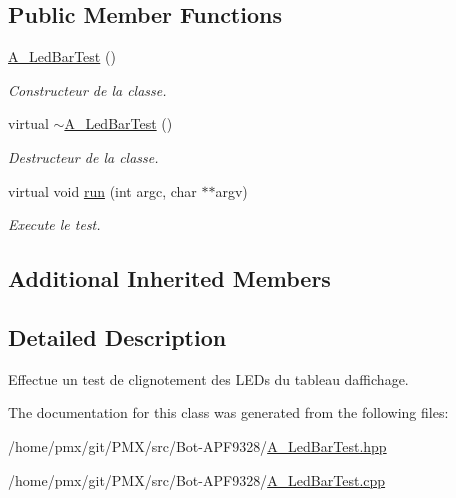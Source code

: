 \subsection*{Public Member Functions}
\begin{DoxyCompactItemize}
\item 
\mbox{\label{classA__LedBarTest_ab3cc5ded06f6910e1cca9cd7a744f1f0}} 
\hyperlink{classA__LedBarTest_ab3cc5ded06f6910e1cca9cd7a744f1f0}{A\+\_\+\+Led\+Bar\+Test} ()
\begin{DoxyCompactList}\small\item\em Constructeur de la classe. \end{DoxyCompactList}\item 
\mbox{\label{classA__LedBarTest_a31f48a88b348e476c7633ebf8ada64f0}} 
virtual \hyperlink{classA__LedBarTest_a31f48a88b348e476c7633ebf8ada64f0}{$\sim$\+A\+\_\+\+Led\+Bar\+Test} ()
\begin{DoxyCompactList}\small\item\em Destructeur de la classe. \end{DoxyCompactList}\item 
\mbox{\label{classA__LedBarTest_ab90a8b6aa14e330f417f72ee5f08e00a}} 
virtual void \hyperlink{classA__LedBarTest_ab90a8b6aa14e330f417f72ee5f08e00a}{run} (int argc, char $\ast$$\ast$argv)
\begin{DoxyCompactList}\small\item\em Execute le test. \end{DoxyCompactList}\end{DoxyCompactItemize}
\subsection*{Additional Inherited Members}


\subsection{Detailed Description}
Effectue un test de clignotement des L\+E\+Ds du tableau d\textquotesingle{}affichage. 

The documentation for this class was generated from the following files\+:\begin{DoxyCompactItemize}
\item 
/home/pmx/git/\+P\+M\+X/src/\+Bot-\/\+A\+P\+F9328/\hyperlink{A__LedBarTest_8hpp}{A\+\_\+\+Led\+Bar\+Test.\+hpp}\item 
/home/pmx/git/\+P\+M\+X/src/\+Bot-\/\+A\+P\+F9328/\hyperlink{A__LedBarTest_8cpp}{A\+\_\+\+Led\+Bar\+Test.\+cpp}\end{DoxyCompactItemize}
